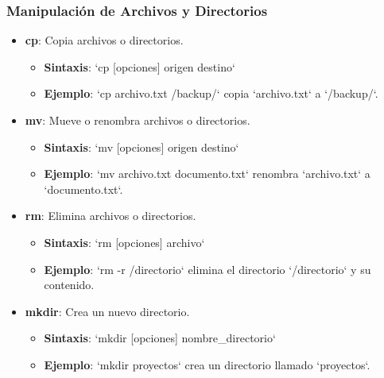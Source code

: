 \documentclass{beamer}
\begin{document}
\begin{frame}
\frametitle{Manipulación de Archivos y Directorios}
\begin{itemize}
    \item \textbf{cp}: Copia archivos o directorios.
    \begin{itemize}
        \item \textbf{Sintaxis}: `cp [opciones] origen destino`
        \item \textbf{Ejemplo}: `cp archivo.txt /backup/` copia `archivo.txt` a `/backup/`.
    \end{itemize}
    \item \textbf{mv}: Mueve o renombra archivos o directorios.
    \begin{itemize}
        \item \textbf{Sintaxis}: `mv [opciones] origen destino`
        \item \textbf{Ejemplo}: `mv archivo.txt documento.txt` renombra `archivo.txt` a `documento.txt`.
    \end{itemize}
    \item \textbf{rm}: Elimina archivos o directorios.
    \begin{itemize}
        \item \textbf{Sintaxis}: `rm [opciones] archivo`
        \item \textbf{Ejemplo}: `rm -r /directorio` elimina el directorio `/directorio` y su contenido.
    \end{itemize}
    \item \textbf{mkdir}: Crea un nuevo directorio.
    \begin{itemize}
        \item \textbf{Sintaxis}: `mkdir [opciones] nombre_directorio`
        \item \textbf{Ejemplo}: `mkdir proyectos` crea un directorio llamado `proyectos`.
    \end{itemize}
\end{itemize}
\end{frame}
\end{document}
